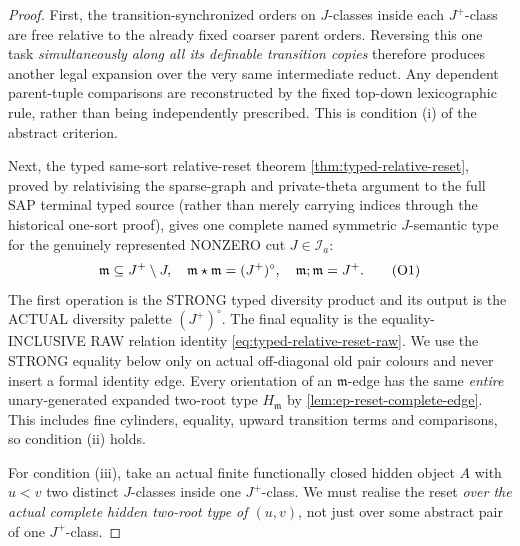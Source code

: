 \begin{proof}
First, the transition-synchronized orders
on $J$-classes inside each $J^+$-class
are free relative to the already fixed
coarser parent orders. Reversing this
one task \emph{simultaneously along all its
definable transition copies} therefore
produces another legal expansion over
the very same intermediate reduct.
Any dependent parent-tuple comparisons
are reconstructed by the fixed top-down
lexicographic rule, rather than being
independently prescribed. This is condition
(i) of the abstract criterion.

Next, the typed same-sort relative-reset theorem
\cref{thm:typed-relative-reset}, proved by
relativising the sparse-graph and private-theta
argument to the full SAP terminal typed source
(rather than merely carrying indices through
the historical one-sort proof), gives one
complete named symmetric $J$-semantic type
for the genuinely represented NONZERO cut
$J\in\mathcal I_a$:
\[
 \mathfrak m\subseteq J^+\setminus J,
 \quad \mathfrak m\mathbin\star\mathfrak m=(J^+)^\circ,
 \quad \mathfrak m;\mathfrak m=J^+.
 \tag{O1}\label{eq:ep-reset}
\]
The first operation is the STRONG
typed diversity product and its
output is the ACTUAL diversity
palette \((J^+)^\circ\).
The final equality is the
equality-INCLUSIVE RAW relation
identity \cref{eq:typed-relative-reset-raw}.
We use the STRONG equality below
only on actual off-diagonal old
pair colours and never insert a
formal identity edge.
Every orientation of an $\mathfrak m$-edge
has the same \emph{entire} unary-generated
expanded two-root type
$H_{\mathfrak m}$ by
\cref{lem:ep-reset-complete-edge}.
This includes fine cylinders, equality,
upward transition terms and comparisons,
so condition (ii) holds.

For condition (iii), take an actual finite
functionally closed hidden object $A$
with $u<v$ two distinct $J$-classes inside
one $J^+$-class. We must realise the reset
\emph{over the actual complete hidden
two-root type of $(u,v)$}, not just over
some abstract pair of one $J^+$-class.


\end{proof}
